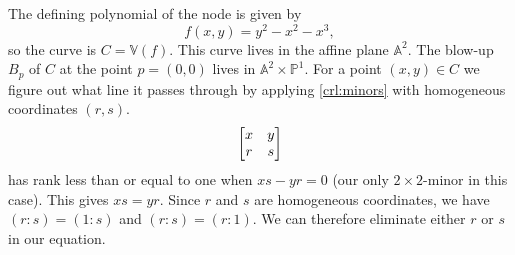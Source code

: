 \documentclass{article}
\newcommand{\A}{\mathbb{A}}
\newcommand{\V}{\mathbb{V}}
\renewcommand{\P}{\mathbb{P}}
\begin{document}
\begin{example}
    The defining polynomial of the node is given by
    \begin{equation}
        \label{eq:node}
        f(x, y) = y^2 - x^2 - x^3,
    \end{equation}
    so the curve is $C = \V(f)$. This curve lives in the affine plane $\A^2$.
    The blow-up $B_p$ of $C$ at the point $p = (0, 0)$ lives in $\A^2 \times
    \P^1$. For a point $(x, y) \in C$ we figure out what line it passes through
    by applying \cref{crl:minors} with homogeneous coordinates $(r, s)$.
    \begin{equation}
        \notag
        \begin{bmatrix}
            x & y \\
            r & s
        \end{bmatrix}
    \end{equation}
    has rank less than or equal to one when $xs - yr = 0$ (our only
    $2\times2$-minor in this case). This gives $xs = yr$. Since $r$ and $s$ are
    homogeneous coordinates, we have $(r : s) = (1 : s)$ and $(r : s) = (r :
    1)$. We can therefore eliminate either $r$ or $s$ in our equation.


\end{example}
\end{document}

